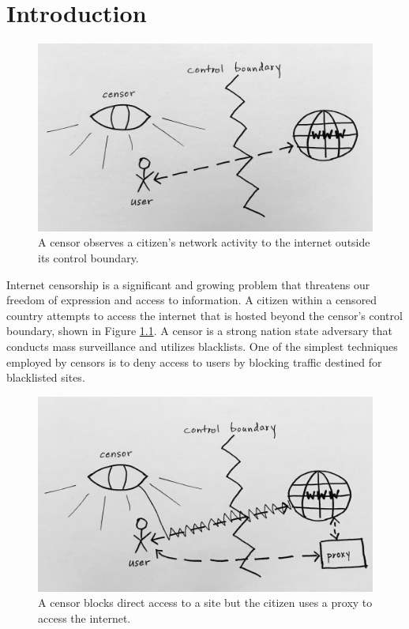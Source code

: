 \chapter{Introduction}
\label{sec:intro} 

\begin{figure}[h!]
\centering
     \includegraphics[width=1.0\textwidth]{fig/censor_simple.png}
    \caption{A censor observes a citizen's network activity to the internet outside its control boundary.}
    
    \label{fig:simplecensor}
\end{figure}

Internet censorship is a significant and growing problem that threatens our freedom of expression and access to information. A citizen within a censored country attempts to access the internet that is hosted beyond the censor's control boundary, shown in Figure \ref{fig:simplecensor}. A censor is a strong nation state adversary that conducts mass surveillance and utilizes blacklists. One of the simplest techniques employed by censors is to deny access to users by blocking traffic destined for blacklisted sites. 

\begin{figure}[h!]
\centering
     \includegraphics[width=1.0\textwidth]{fig/censor_block.png}
    \caption{A censor blocks direct access to a site but the citizen uses a proxy to access the internet.}
    
    \label{fig:censorblock}
\end{figure}

